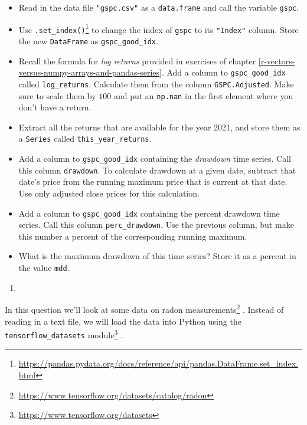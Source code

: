 \documentclass[12pt,krantz2]{krantz}
\providecommand{\tightlist}{%
  \setlength{\itemsep}{0pt}\setlength{\parskip}{0pt}}
\renewcommand{\href}[2]{#2\footnote{\url{#1}}}
\begin{document}
\begin{itemize}
\tightlist
\item
  Read in the data file \texttt{"gspc.csv"} as a \texttt{data.frame} and call the variable \texttt{gspc}.
\item
  Use \href{https://pandas.pydata.org/docs/reference/api/pandas.DataFrame.set_index.html}{\texttt{.set\_index()}} to change the index of \texttt{gspc} to its \texttt{"Index"} column. Store the new \texttt{DataFrame} as \texttt{gspc\_good\_idx}.
\item
  Recall the formula for \emph{log returns} provided in exercises of chapter \ref{r-vectors-versus-numpy-arrays-and-pandas-series}. Add a column to \texttt{gspc\_good\_idx} called \texttt{log\_returns}. Calculate them from the column \texttt{GSPC.Adjusted}. Make sure to scale them by \(100\) and put an \texttt{np.nan} in the first element where you don't have a return.
\item
  Extract all the returns that are available for the year 2021, and store them as a \texttt{Series} called \texttt{this\_year\_returns}.
\item
  Add a column to \texttt{gspc\_good\_idx} containing the \emph{drawdown} time series. Call this column \texttt{drawdown}. To calculate drawdown at a given date, subtract that date's price from the running maximum price that is current at that date. Use only adjusted close prices for this calculation.\\
\item
  Add a column to \texttt{gspc\_good\_idx} containing the percent drawdown time series. Call this column \texttt{perc\_drawdown}. Use the previous column, but make this number a percent of the corresponding running maximum.
\item
  What is the maximum drawdown of this time series? Store it as a percent in the value \texttt{mdd}.
\end{itemize}

\begin{enumerate}
\def\labelenumi{\arabic{enumi}.}
\setcounter{enumi}{1}
\item
\end{enumerate}

In this question we'll look at \href{https://www.tensorflow.org/datasets/catalog/radon}{some data on radon measurements} \citep{GelmanHill:2007}. Instead of reading in a text file, we will load the data into Python using the \href{https://www.tensorflow.org/datasets}{\texttt{tensorflow\_datasets} module} \citep{TFDS}.
\end{document}
